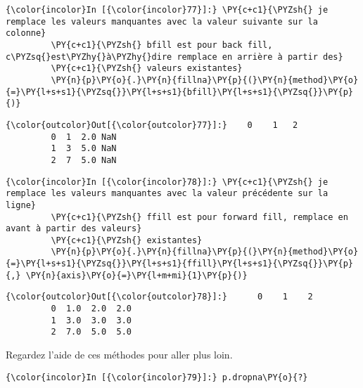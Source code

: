     \begin{Verbatim}[commandchars=\\\{\},frame=single,framerule=0.3mm,rulecolor=\color{cellframecolor}]
{\color{incolor}In [{\color{incolor}77}]:} \PY{c+c1}{\PYZsh{} je remplace les valeurs manquantes avec la valeur suivante sur la colonne}
         \PY{c+c1}{\PYZsh{} bfill est pour back fill, c\PYZsq{}est\PYZhy{}à\PYZhy{}dire remplace en arrière à partir des}
         \PY{c+c1}{\PYZsh{} valeurs existantes}
         \PY{n}{p}\PY{o}{.}\PY{n}{fillna}\PY{p}{(}\PY{n}{method}\PY{o}{=}\PY{l+s+s1}{\PYZsq{}}\PY{l+s+s1}{bfill}\PY{l+s+s1}{\PYZsq{}}\PY{p}{)}
\end{Verbatim}


\begin{Verbatim}[commandchars=\\\{\},frame=single,framerule=0.3mm,rulecolor=\color{cellframecolor}]
{\color{outcolor}Out[{\color{outcolor}77}]:}    0    1   2
         0  1  2.0 NaN
         1  3  5.0 NaN
         2  7  5.0 NaN
\end{Verbatim}
            
    \begin{Verbatim}[commandchars=\\\{\},frame=single,framerule=0.3mm,rulecolor=\color{cellframecolor}]
{\color{incolor}In [{\color{incolor}78}]:} \PY{c+c1}{\PYZsh{} je remplace les valeurs manquantes avec la valeur précédente sur la ligne}
         \PY{c+c1}{\PYZsh{} ffill est pour forward fill, remplace en avant à partir des valeurs}
         \PY{c+c1}{\PYZsh{} existantes}
         \PY{n}{p}\PY{o}{.}\PY{n}{fillna}\PY{p}{(}\PY{n}{method}\PY{o}{=}\PY{l+s+s1}{\PYZsq{}}\PY{l+s+s1}{ffill}\PY{l+s+s1}{\PYZsq{}}\PY{p}{,} \PY{n}{axis}\PY{o}{=}\PY{l+m+mi}{1}\PY{p}{)}
\end{Verbatim}


\begin{Verbatim}[commandchars=\\\{\},frame=single,framerule=0.3mm,rulecolor=\color{cellframecolor}]
{\color{outcolor}Out[{\color{outcolor}78}]:}      0    1    2
         0  1.0  2.0  2.0
         1  3.0  3.0  3.0
         2  7.0  5.0  5.0
\end{Verbatim}
            
    Regardez l'aide de ces méthodes pour aller plus loin.

    \begin{Verbatim}[commandchars=\\\{\},frame=single,framerule=0.3mm,rulecolor=\color{cellframecolor}]
{\color{incolor}In [{\color{incolor}79}]:} p.dropna\PY{o}{?}
\end{Verbatim}


